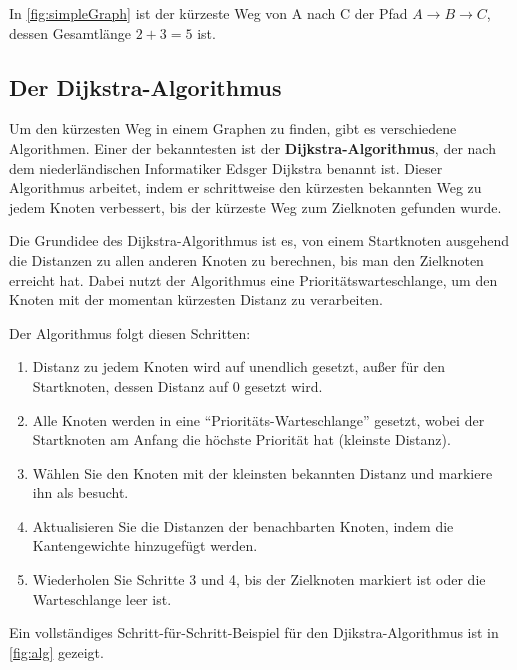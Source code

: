 In \cref{fig:simpleGraph} ist der kürzeste Weg von A nach C der Pfad $A \rightarrow B \rightarrow C$, dessen Gesamtlänge $2 + 3 = 5$ ist.

\subsection{Der Dijkstra-Algorithmus}

Um den kürzesten Weg in einem Graphen zu finden, gibt es verschiedene Algorithmen. Einer der bekanntesten ist der \textbf{Dijkstra-Algorithmus}, der nach dem niederländischen Informatiker Edsger Dijkstra benannt ist. Dieser Algorithmus arbeitet, indem er schrittweise den kürzesten bekannten Weg zu jedem Knoten verbessert, bis der kürzeste Weg zum Zielknoten gefunden wurde.

Die Grundidee des Dijkstra-Algorithmus ist es, von einem Startknoten ausgehend die Distanzen zu allen anderen Knoten zu berechnen, bis man den Zielknoten erreicht hat. Dabei nutzt der Algorithmus eine Prioritätswarteschlange, um den Knoten mit der momentan kürzesten Distanz zu verarbeiten.

Der Algorithmus folgt diesen Schritten:

\begin{enumerate}
    \item Distanz zu jedem Knoten wird auf unendlich gesetzt, außer für den Startknoten, dessen Distanz auf 0 gesetzt wird.
    \item Alle Knoten werden in eine ``Prioritäts-Warteschlange'' gesetzt, wobei der Startknoten am Anfang die höchste Priorität hat (kleinste Distanz).
    \item Wählen Sie den Knoten mit der kleinsten bekannten Distanz und markiere ihn als besucht.
    \item Aktualisieren Sie die Distanzen der benachbarten Knoten, indem die Kantengewichte hinzugefügt werden.
    \item Wiederholen Sie Schritte 3 und 4, bis der Zielknoten markiert ist oder die Warteschlange leer ist.
\end{enumerate}


Ein vollständiges Schritt-für-Schritt-Beispiel für den Djikstra-Algorithmus ist in \cref{fig:alg} gezeigt.


